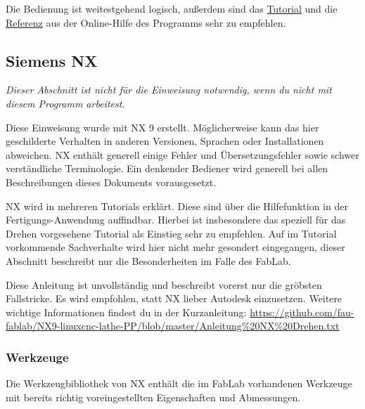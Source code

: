 \documentclass{\basedir/fablab-document}
\begin{document}
Die Bedienung ist weitestgehend logisch, außerdem sind das \href{http://help.autodesk.com/view/INVHSM/2016/DEU/?guid=GUID-56A84DA8-46DB-458A-91FD-41791CE6FABA}{Tutorial} und die \href{http://help.autodesk.com/view/INVHSM/2016/DEU/?guid=GUID-7B7A2457-8EE9-4AE0-839B-6271340A396C}{Referenz} aus der Online-Hilfe des Programms sehr zu empfehlen.

\subsection{Siemens NX}
\emph{Dieser Abschnitt ist nicht für die Einweisung notwendig, wenn du nicht mit diesem Programm arbeitest.}

Diese Einweisung wurde mit NX 9 erstellt. Möglicherweise kann das hier geschilderte Verhalten in anderen Versionen, Sprachen oder Installationen abweichen. NX enthält generell einige Fehler und Übersetzungsfehler sowie schwer verständliche Terminologie. Ein denkender Bediener wird generell bei allen Beschreibungen dieses Dokuments vorausgesetzt.

NX wird in mehreren Tutorials erklärt. Diese sind über die Hilfefunktion in der Fertigungs-Anwendung auffindbar. Hierbei ist insbesondere das speziell für das Drehen vorgesehene Tutorial als Einstieg sehr zu empfehlen. Auf im Tutorial vorkommende Sachverhalte wird hier nicht mehr gesondert eingegangen, dieser Abschnitt beschreibt nur die Besonderheiten im Falle des FabLab.

Diese Anleitung ist unvollständig und beschreibt vorerst nur die gröbsten Fallstricke. Es wird empfohlen, statt NX lieber Autodesk einzusetzen. Weitere wichtige Informationen findest du in der Kurzanleitung: \url{https://github.com/fau-fablab/NX9-linuxcnc-lathe-PP/blob/master/Anleitung%20NX%20Drehen.txt}

\subsubsection{Werkzeuge}
Die Werkzeugbibliothek von NX enthält die im FabLab vorhandenen Werkzeuge mit bereits richtig voreingestellten Eigenschaften und Abmessungen. 


\end{document}
